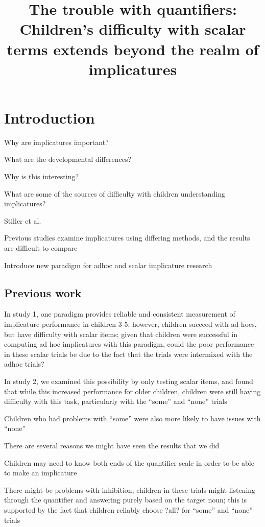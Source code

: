 \documentclass[man]{apa2}
\title{The trouble with quantifiers: Children's difficulty with scalar terms extends beyond the realm of implicatures}
\begin{document}
\maketitle               

\section{Introduction}
Why are implicatures important? 

What are the developmental differences?

Why is this interesting?

What are some of the sources of difficulty with children understanding implicatures? 

Stiller et al. 

Previous studies examine implicatures using differing methods, and the results are difficult to compare

Introduce new paradigm for adhoc and scalar implicature research 


\subsection{Previous work}

In study 1,  one paradigm provides reliable and consistent measurement of implicature performance in children 3-5; however, children succeed with ad hocs, but have difficulty with scalar items; given that children were successful in computing ad hoc implicatures with this paradigm, could the poor performance in these scalar trials be due to the fact that the trials were intermixed with the adhoc trials?

In study 2, we examined this possibility by only testing scalar items, and found that while this increased performance for older children, children were still having difficulty with this task, particularly with the ``some'' and ``none'' trials

Children who had problems with ``some'' were also more likely to have issues with ``none'' 

There are several reasons we might have seen the results that we did

Children may need to know both ends of the quantifier scale in order to be able to make an implicature

There might be problems with inhibition; children in these trials might listening through the quantifier and answering purely based on the target noun; this is supported by the fact that children reliably choose ?all? for ``some'' and ``none'' trials
\end{document}
